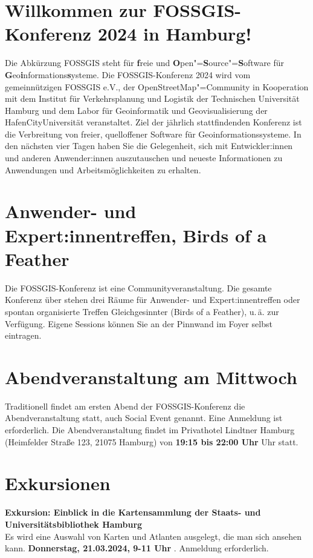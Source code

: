 \newpage
\section*{Willkommen zur FOSSGIS-Konferenz 2024 in Hamburg!}\label{welcome}
Die Abkürzung { FOSSGIS} steht für {\bfseries f}reie und {\bfseries O}pen"={\bfseries S}ource"={\bfseries S}oftware für {\bfseries G}eo{\bfseries i}nformations{\bfseries s}ysteme.
Die FOSSGIS-Konferenz 2024 wird vom gemeinnützigen FOSSGIS e.V., der
OpenStreetMap"=Community in Kooperation mit dem Institut für Verkehrsplanung und Logistik der Technischen Universität Hamburg und dem Labor für Geoinformatik und Geovisualisierung der HafenCityUniversität veranstaltet. 
Ziel der jährlich stattfindenden Konferenz ist die Verbreitung von freier,
quelloffener Software für Geoinformationssysteme. In den nächsten vier Tagen
haben Sie die Gelegenheit, sich mit Entwickler:innen und anderen Anwender:innen
auszutauschen und \mbox{neueste} Informationen zu Anwendungen und
Arbeitsmöglichkeiten zu erhalten.

\section*{Anwender- und Expert:innentreffen, Birds of a Feather}
Die FOSSGIS-Konferenz ist eine Communityveranstaltung.
Die gesamte Konferenz über stehen drei Räume für Anwender- und Expert:innentreffen oder spontan organisierte Treffen Gleichgesinnter (Birds of a Feather), u.\,ä.
zur Verfügung. Eigene Sessions können Sie an der Pinnwand im Foyer selbst eintragen.
\pagebreak

\section*{Abendveranstaltung am Mittwoch}\label{schwaetzli}
Traditionell findet am ersten Abend der FOSSGIS-Konferenz die Abendveranstaltung statt, auch Social Event genannt. Eine Anmeldung ist erforderlich.
Die Abendveranstaltung findet im Privathotel Lindtner Hamburg (Heimfelder Straße 123, 21075 Hamburg) von {\bfseries 19:15 bis 22:00 Uhr} Uhr statt.

\section*{Exkursionen}
\noindent
{\large \bfseries Exkursion: Einblick in die Kartensammlung der Staats- und Universitätsbibliothek Hamburg}\\
Es wird eine Auswahl von Karten und Atlanten ausgelegt, die man sich ansehen kann. {\bfseries Donnerstag, 21.03.2024, 9-11 Uhr }. Anmeldung erforderlich.
\bigskip

